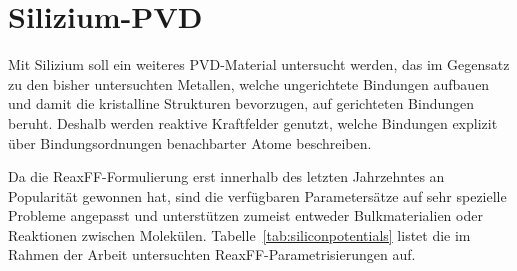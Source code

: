\section{Silizium-PVD}
\label{siliconpvd}

Mit Silizium soll ein weiteres PVD-Material untersucht werden, das im Gegensatz zu den bisher untersuchten Metallen, welche ungerichtete Bindungen aufbauen und damit die kristalline Strukturen bevorzugen, auf gerichteten Bindungen beruht.
Deshalb werden reaktive Kraftfelder genutzt, welche Bindungen explizit über Bindungsordnungen benachbarter Atome beschreiben.

Da die ReaxFF-Formulierung erst innerhalb des letzten Jahrzehntes an Popularität gewonnen hat, sind die verfügbaren Parametersätze auf sehr spezielle Probleme angepasst und unterstützen zumeist entweder Bulkmaterialien oder Reaktionen zwischen Molekülen.
Tabelle~\ref{tab:siliconpotentials} listet die im Rahmen der Arbeit untersuchten ReaxFF-Parametrisierungen auf.

